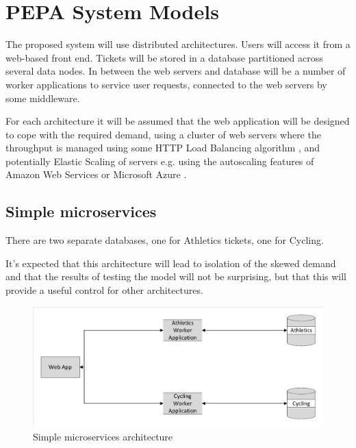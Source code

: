 %
%

\section{PEPA System Models}\label{sec:pepa-system-models}
\begin{shaded}
The proposed system will use distributed architectures.  Users will access it from a web-based front end.  Tickets will be stored in a database partitioned across several data nodes.  In between the web servers and database will be a number of worker applications to service user requests, connected to the web servers by some middleware.

For each architecture it will be assumed that the web application will be designed to cope with the required demand, using a cluster of web servers where the throughput is managed using some HTTP Load Balancing algorithm \cite{RN73}, and potentially Elastic Scaling of servers e.g. using the autoscaling features of Amazon Web Services \cite{RN1064} or Microsoft Azure \cite{RN1065}.
\end{shaded}

%
%
\FloatBarrier
\subsection{Simple microservices}

There are two separate databases, one for Athletics tickets, one for Cycling.

It's expected that this architecture will lead to isolation of the skewed demand and that the results of testing the model will not be surprising, but that this will provide a useful control for other architectures.

\begin{figure}
	\caption{Simple microservices architecture}
	\centering
	\includegraphics[trim = 5 5 5 5, clip, width=\textwidth]{img/simplemicro}
\end{figure}

